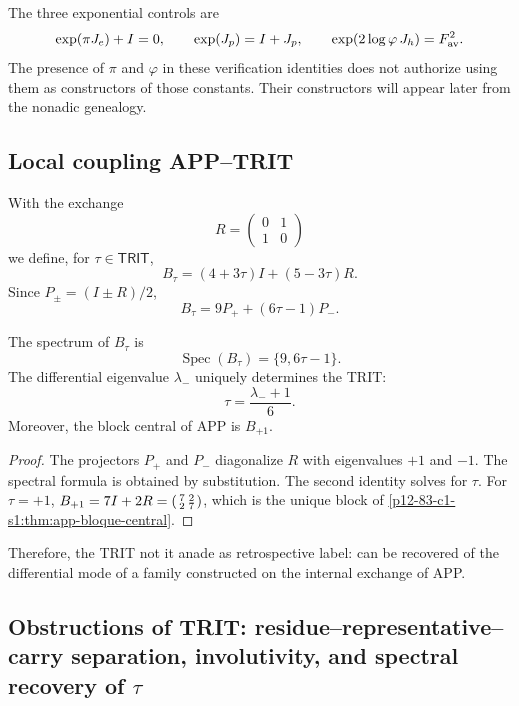 The three exponential controls are
\[
 \exp(\pi J_e)+I=0,
 \qquad
 \exp(J_p)=I+J_p,
 \qquad
 \exp(2\log\varphi\,J_h)=F_{\rm av}^2.
\]
The presence of \(\pi\) and \(\varphi\) in these verification identities
does not authorize using them as constructors of those constants. Their
constructors will appear later from the nonadic genealogy.

\subsection{Local coupling APP--TRIT}

With the exchange
\[
 R=\begin{pmatrix}0&1\\1&0\end{pmatrix}
\]
we define, for \(\tau\in\mathsf{TRIT}\),
\[
 B_\tau=(4+3\tau)I+(5-3\tau)R.
\]
Since \(P_\pm=(I\pm R)/2\),
\[
 B_\tau=9P_++(6\tau-1)P_-.
\]

\begin{theorem}
\label{p12-83-c1-s11:thm:app-trit-recuperacion-espectral}
The spectrum of \(B_\tau\) is
\[
 \operatorname{Spec}(B_\tau)=\{9,6\tau-1\}.
\]
The differential eigenvalue \(\lambda_-\) uniquely determines the TRIT:
\[
 \tau=\frac{\lambda_-+1}{6}.
\]
Moreover, the block central of APP is \(B_{+1}\).
\end{theorem}

\begin{proof}
The projectors \(P_+\) and \(P_-\) diagonalize \(R\) with eigenvalues
\(+1\) and \(-1\). The spectral formula is obtained by substitution. The second
identity solves for \(\tau\). For \(\tau=+1\),
\(B_{+1}=7I+2R=\begin{psmallmatrix}7&2\\2&7\end{psmallmatrix}\), which is
the unique block of \cref{p12-83-c1-s1:thm:app-bloque-central}.
\end{proof}

Therefore, the TRIT not it anade as retrospective label: can be recovered
of the differential mode of a family constructed on the internal exchange
of APP.

\subsection{Obstructions of TRIT: residue--representative--carry separation, involutivity, and spectral recovery of \(\tau\)}


